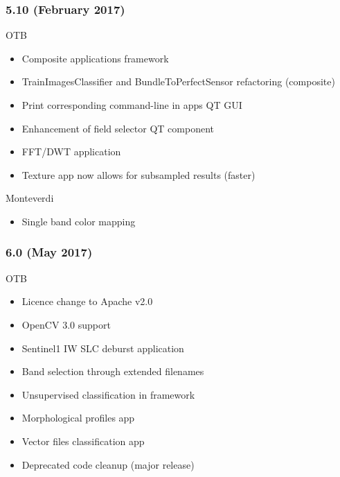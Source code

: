 \documentclass[8pt]{beamer}
\begin{document}
\begin{frame}
  \frametitle{5.10 (February 2017)}
  \begin{block}{OTB}
    \begin{itemize}
      \item Composite applications framework 
      \item TrainImagesClassifier and BundleToPerfectSensor refactoring (composite)
      \item Print corresponding command-line in apps QT GUI
      \item Enhancement of field selector QT component
      \item FFT/DWT application
      \item Texture app now allows for subsampled results (faster)
    \end{itemize}
  \end{block}
  
  \begin{block}{Monteverdi}
    \begin{itemize}
      \item Single band color mapping
      \end{itemize}
  \end{block}
      
\end{frame}

\begin{frame}
  \frametitle{6.0 (May 2017)}
  \begin{block}{OTB}
    \begin{itemize}
      \item Licence change to  Apache v2.0
      \item OpenCV 3.0 support
      \item Sentinel1 IW SLC deburst application
      \item Band selection through extended filenames
      \item Unsupervised classification in framework
      \item Morphological profiles app
      \item Vector files classification app
      \item Deprecated code cleanup (major release)
    \end{itemize}
    \end{block}
\end{frame}
\end{document}
